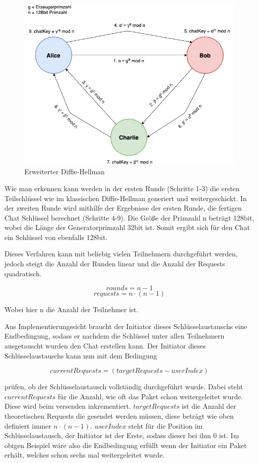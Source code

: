 \begin{figure}[h]
  \centering
  \includegraphics[width=\textwidth]{dh.png}
  
  \caption{Erweiterter Diffie-Hellman}
\end{figure}

Wie man erkennen kann werden in der ersten Runde (Schritte 1-3) die ersten Teilschlüssel wie im klassischen Diffie-Hellman generiert und weitergeschickt. In der zweiten Runde wird mithilfe der Ergebnisse der ersten Runde, die fertigen Chat Schlüssel berechnet (Schritte 4-9). Die Größe der Primzahl n beträgt 128bit, wobei die Länge der Generatorprimzahl 32bit ist. Somit ergibt sich für den Chat ein Schlüssel von ebenfalls 128bit.

\newpage

Dieses Verfahren kann mit beliebig vielen Teilnehmern durchgeführt
werden, jedoch steigt die Anzahl der Runden linear und die Anzahl der 
Requests quadratisch.

$$ rounds = n - 1 $$
$$ requests = n \cdot (n - 1) $$

Wobei hier n die Anzahl der Teilnehmer ist.

Aus Implementierungssicht braucht der Initiator dieses
Schlüsselaustauschs eine Endbedingung, sodass er nachdem
die Schlüssel unter allen Teilnehmern ausgetauscht wurden 
den Chat erstellen kann. Der Initiator dieses Schlüsselaustauschs 
kann nun mit dem Bedingung

$$ currentRequests = (targetRequests - userIndex) $$

prüfen, ob der Schlüsselaustausch vollständig durchgeführt wurde. Dabei steht 
$ currentRequests $ für die Anzahl, wie oft das Paket schon weitergeleitet
wurde. Diese wird beim versenden inkrementiert. $ targetRequests $
ist die Anzahl der theoretischen Requests die gesendet werden müssen, diese
beträgt wie oben definiert immer $ n \cdot (n - 1) $. $ userIndex $ steht
für die Position im Schlüsselaustausch, der Initiator ist der Erste, sodass
dieser bei ihm 0 ist. Im obigen Beispiel wäre also die Endbedingung
erfüllt wenn der Initiator ein Paket erhält, welches schon sechs mal 
weitergeleitet wurde.

